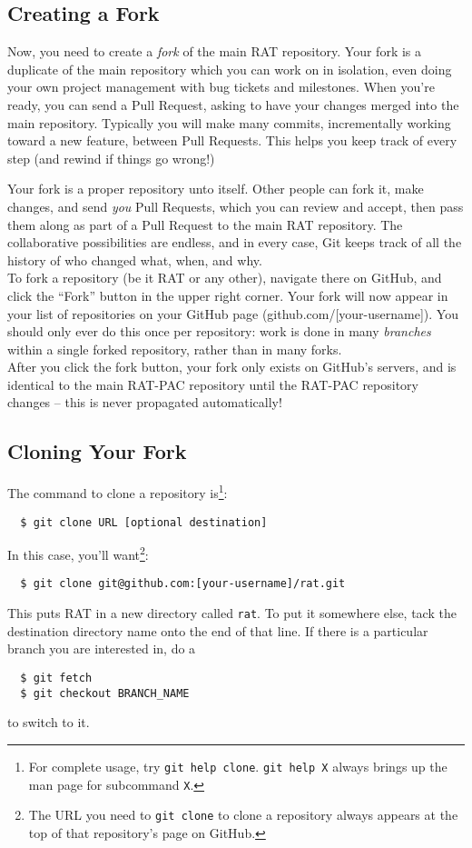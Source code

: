 \documentclass{article}
\begin{document}
\subsection{Creating a Fork}
\label{create-fork}
Now, you need to create a {\it fork} of the main RAT repository. Your fork is
a duplicate of the main repository which you can work on in isolation,
even doing your own project management with bug tickets and milestones.
When you're ready, you can send a Pull Request, asking to have your changes
merged into the main repository. Typically you will make many commits,
incrementally working toward a new feature, between Pull Requests. This
helps you keep track of every step (and rewind if things go wrong!)

Your fork is a proper repository unto itself. Other people can fork it,
make changes, and send {\it you} Pull Requests, which you can review and
accept, then pass them along as part of a Pull Request to the main RAT
repository. The collaborative possibilities are endless, and in every case,
Git keeps track of all the history of who changed what, when, and why.\\

To fork a repository (be it RAT or any other),
navigate there on GitHub, and click the ``Fork'' button in the upper right
corner. Your fork will now appear in your list of repositories on your GitHub
page (github.com/[your-username]). You should only ever do this once per
repository: work is done in many {\it branches} within a single forked
repository, rather than in many forks.\\

After you click the fork button, your fork only exists on GitHub's servers,
and is identical to the main RAT-PAC repository until the RAT-PAC repository
changes -- this is never propagated automatically!

\subsection{Cloning Your Fork}
\label{sec:manual-install}
The command to clone a repository is\footnote{For complete usage,
try {\tt git help clone}. {\tt git help X} always brings up the man page for
subcommand {\tt X}.}:

\begin{verbatim}
  $ git clone URL [optional destination]
\end{verbatim}
In this case, you'll want\footnote{The URL you need to {\tt git clone} to
clone a repository always appears at the top of that repository's page on
GitHub.}:
\begin{verbatim}
  $ git clone git@github.com:[your-username]/rat.git
\end{verbatim}
This puts RAT in a new directory called {\tt rat}. To put it somewhere else,
tack the destination directory name onto the end of that line. If there is a
particular branch you are interested in, do a
\begin{verbatim}
  $ git fetch
  $ git checkout BRANCH_NAME
\end{verbatim}
to switch to it.\\
\end{document}
